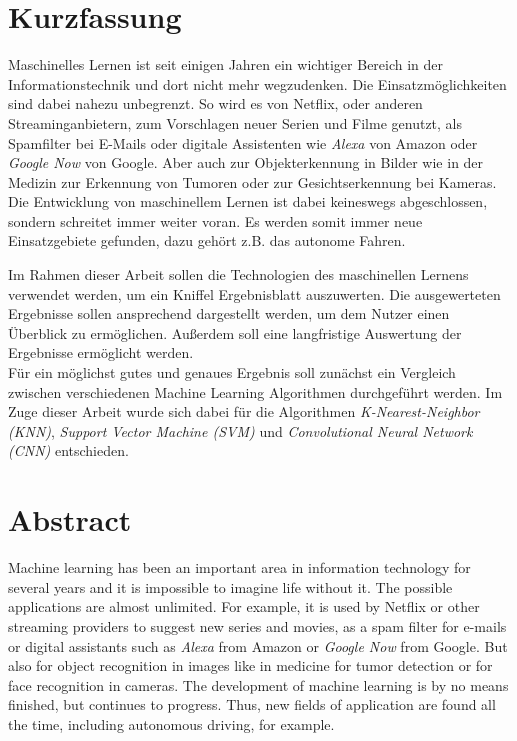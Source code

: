 
\pagestyle{empty}

\chapter*{Kurzfassung}	%
Maschinelles Lernen ist seit einigen Jahren ein wichtiger Bereich in der Informationstechnik und dort nicht mehr wegzudenken. Die Einsatzmöglichkeiten sind dabei nahezu unbegrenzt. So wird es von Netflix, oder anderen Streaminganbietern, zum Vorschlagen neuer Serien und Filme genutzt, als Spamfilter bei E-Mails oder digitale Assistenten wie \textit{Alexa} von Amazon oder \textit{Google Now} von Google. Aber auch zur Objekterkennung in Bilder wie in der Medizin zur Erkennung von Tumoren oder zur Gesichtserkennung bei Kameras. Die Entwicklung von maschinellem Lernen ist dabei keineswegs abgeschlossen, sondern schreitet immer weiter voran. Es werden somit immer neue Einsatzgebiete gefunden, dazu gehört z.B. das autonome Fahren.\par

Im Rahmen dieser Arbeit sollen die Technologien des maschinellen Lernens verwendet werden, um ein Kniffel Ergebnisblatt auszuwerten. Die ausgewerteten Ergebnisse sollen ansprechend dargestellt werden, um dem Nutzer einen Überblick zu ermöglichen. Außerdem soll eine langfristige Auswertung der Ergebnisse ermöglicht werden.\\ \hfill
Für ein möglichst gutes und genaues Ergebnis soll zunächst ein Vergleich zwischen verschiedenen Machine Learning Algorithmen durchgeführt werden. Im Zuge dieser Arbeit wurde sich dabei für die Algorithmen \textit{K-Nearest-Neighbor (KNN)}, \textit{Support Vector Machine (SVM)} und \textit{Convolutional Neural Network (CNN)} entschieden.


\newpage
\chapter*{Abstract} %
Machine learning has been an important area in information technology for several years and it is impossible to imagine life without it. The possible applications are almost unlimited. For example, it is used by Netflix or other streaming providers to suggest new series and movies, as a spam filter for e-mails or digital assistants such as \textit{Alexa} from Amazon or \textit{Google Now} from Google. But also for object recognition in images like in medicine for tumor detection or for face recognition in cameras. The development of machine learning is by no means finished, but continues to progress. Thus, new fields of application are found all the time, including autonomous driving, for example.\par

